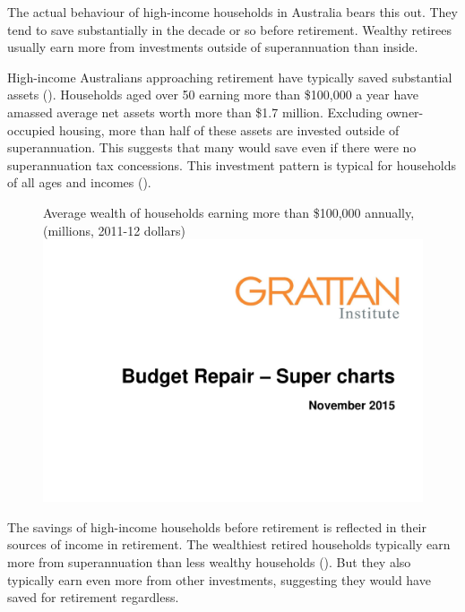 \documentclass{grattanAlpha}
\begin{document}
The actual behaviour of high-income households in Australia bears this out. They tend to save substantially in the decade or so before retirement. Wealthy retirees usually earn more from investments outside of superannuation than inside. 

High-income Australians approaching retirement have typically saved substantial assets (). Households aged over 50 earning more than \$100,000 a year have amassed average net assets worth more than \$1.7 million. Excluding owner-occupied housing, more than half of these assets are invested outside of superannuation. This suggests that many would save even if there were no superannuation tax concessions. This investment pattern is typical for households of all ages and incomes ().

\begin{figure}
%
{Average wealth of households earning more than \$100,000 annually, (millions, 2011-12 dollars)}\label{fig:SUPER-3-2}
\includegraphics[width=\columnwidth,page=11]{super-atlas/PPTX.pdf}

\end{figure}

The savings of high-income households before retirement is reflected in their sources of income in retirement. The wealthiest retired households typically earn more from superannuation than less wealthy households (). But they also typically earn even more from other investments, suggesting they would have saved for retirement regardless.
\end{document}
